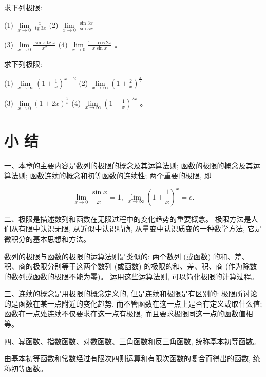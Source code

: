 \documentclass[lang=cn,newtx,12pt,scheme=chinese]{elegantbook}
\begin{document}
\begin{problemset}[习 题 三]
\item 求下列极限:

(1) \(\mathop{\lim }\limits_{{x \rightarrow 0}}\frac{x}{\operatorname{tg}{3x}}\) (2) \(\mathop{\lim }\limits_{{x \rightarrow 0}}\frac{\sin {3x}}{\sin {5x}}\)

(3) \(\mathop{\lim }\limits_{{x \rightarrow 0}}\frac{\sin x\operatorname{tg}x}{{x}^{2}}\) (4) \(\mathop{\lim }\limits_{{x \rightarrow 0}}\frac{1 - \cos {2x}}{x\sin x}\) 。

\item 求下列极限:

(1) \(\mathop{\lim }\limits_{{x \rightarrow \infty }}{\left( 1 + \frac{1}{x}\right) }^{x + 2}\) (2) \(\mathop{\lim }\limits_{{x \rightarrow \infty }}{\left( 1 + \frac{2}{x}\right) }^{\frac{x}{2}}\)

(3) \(\mathop{\lim }\limits_{{x \rightarrow 0}}{\left( 1 + 2x\right) }^{\frac{1}{x}}\) (4) \(\mathop{\lim }\limits_{{x \rightarrow \infty }}{\left( 1 - \frac{1}{x}\right) }^{2x}\) 。
\end{problemset}

\chapter*{小 结}

一、本章的主要内容是数列的极限的概念及其运算法则; 函数的极限的概念及其运算法则; 函数连续的概念和初等函数的连续性; 两个重要的极限, 即

\[
\mathop{\lim }\limits_{{x \rightarrow 0}}\frac{\sin x}{x} = 1,\;\mathop{\lim }\limits_{{x \rightarrow \infty }}{\left( 1 + \frac{1}{x}\right) }^{x} = e.
\]

二、极限是描述数列和函数在无限过程中的变化趋势的重要概念。 极限方法是人们从有限中认识无限, 从近似中认识精确, 从量变中认识质变的一种数学方法, 它是微积分的基本思想和方法。

数列的极限与函数的极限的运算法则是类似的: 两个数列 (或函数) 的和、差、积、商的极限分别等于这两个数列 (或函数) 的极限的和、差、积、商 (作为除数的数列或函数的极限不能为零)。 运用这些运算法则, 可以简化极限的计算过程。

三、连续的概念是用极限的概念定义的, 但是连续和极限是有区别的: 极限所讨论的是函数在某一点附近的变化趋势, 而不管函数在这一点上是否有定义或取什么值; 函数在一点处连续不仅要求在这一点有极限, 而且要求极限同这一点的函数值相等。

四、幂函数、指数函数、对数函数、三角函数和反三角函数, 统称基本初等函数。

由基本初等函数和常数经过有限次四则运算和有限次函数的复合而得出的函数, 统称初等函数。
\end{document}
